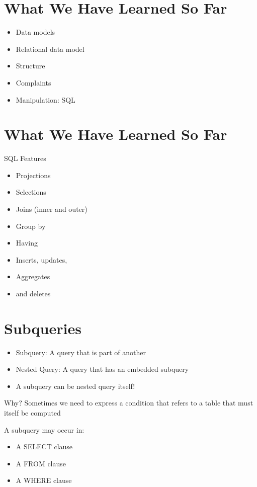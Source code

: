 \documentclass{article}
\begin{document}
\newpage

\section*{What We Have Learned So Far}

\begin{itemize}
\item Data models
\item Relational data model
\item Structure
\item Complaints
\item Manipulation: SQL
\end{itemize}

\section*{What We Have Learned So Far}

SQL Features

\begin{itemize}
\item Projections
\item Selections
\item Joins (inner and outer)
\item Group by
\item Having
\item Inserts, updates,
\item Aggregates
\item and deletes
\end{itemize}

\section*{Subqueries}

\begin{itemize}
\item Subquery: A query that is part of another
\item Nested Query: A query that has an embedded subquery
\item A subquery can be nested query itself!
\end{itemize}

Why?
Sometimes we need to express a condition that refers to a table that must itself be computed

A subquery may occur in:

\begin{itemize}
\item A SELECT clause
\item A FROM clause
\item A WHERE clause
\end{itemize}
\end{document}
